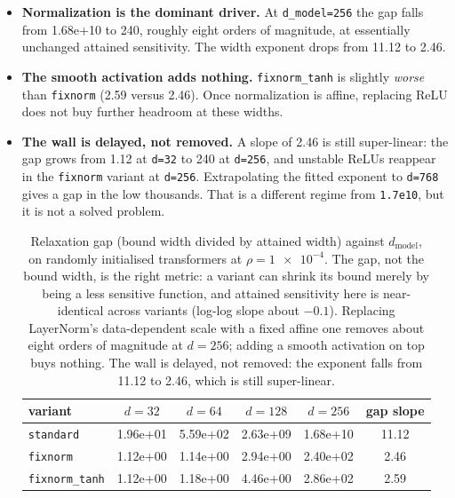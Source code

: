 \documentclass[10pt,journal]{IEEEtran}
\begin{document}
\begin{itemize}
\item \textbf{Normalization is the dominant driver.} At \texttt{d\_model=256} the gap falls from 1.68e+10 to 240, roughly eight orders of magnitude, at essentially unchanged attained sensitivity. The width exponent drops from 11.12 to 2.46.
\item \textbf{The smooth activation adds nothing.} \texttt{fixnorm\_tanh} is slightly \emph{worse} than \texttt{fixnorm} (2.59 versus 2.46). Once normalization is affine, replacing ReLU does not buy further headroom at these widths.
\item \textbf{The wall is delayed, not removed.} A slope of 2.46 is still super-linear: the gap grows from 1.12 at \texttt{d=32} to 240 at \texttt{d=256}, and unstable ReLUs reappear in the \texttt{fixnorm} variant at \texttt{d=256}. Extrapolating the fitted exponent to \texttt{d=768} gives a gap in the low thousands. That is a different regime from \texttt{1.7e10}, but it is not a solved problem.

\begin{table}[t]
\centering
\caption{Relaxation gap (bound width divided by attained width) against $d_{\text{model}}$, on randomly initialised transformers at $\rho=\num{1e-4}$. The gap, not the bound width, is the right metric: a variant can shrink its bound merely by being a less sensitive function, and attained sensitivity here is near-identical across variants (log-log slope about $-0.1$). Replacing LayerNorm's data-dependent scale with a fixed affine one removes about eight orders of magnitude at $d=256$; adding a smooth activation on top buys nothing. The wall is delayed, not removed: the exponent falls from 11.12 to 2.46, which is still super-linear.}
\label{tab:variants}
\begin{tabular}{l S[table-format=1.2e2] S[table-format=1.2e2] S[table-format=1.2e2] S[table-format=1.2e2] S[table-format=2.2]}
\toprule
variant & {$d{=}32$} & {$d{=}64$} & {$d{=}128$} & {$d{=}256$} & {gap slope} \\
\midrule
\texttt{standard} & 1.96e+01 & 5.59e+02 & 2.63e+09 & 1.68e+10 & 11.12 \\
\texttt{fixnorm} & 1.12e+00 & 1.14e+00 & 2.94e+00 & 2.40e+02 & 2.46 \\
\texttt{fixnorm\_tanh} & 1.12e+00 & 1.18e+00 & 4.46e+00 & 2.86e+02 & 2.59 \\
\bottomrule
\end{tabular}
\end{table}

\end{itemize}
\end{document}
